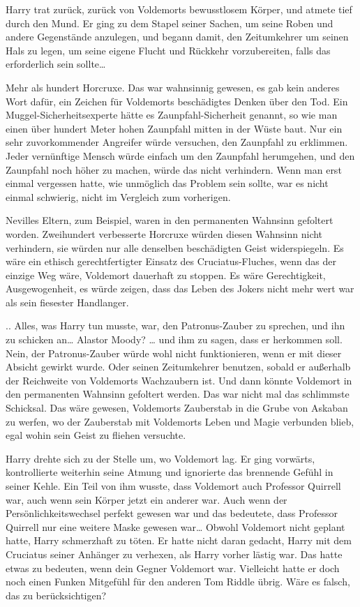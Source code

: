 {Harry trat zurück, zurück von Voldemorts bewusstlosem Körper, und atmete tief durch den Mund. Er ging zu dem Stapel seiner Sachen, um seine Roben und andere Gegenstände anzulegen, und begann damit, den Zeitumkehrer um seinen Hals zu legen, um seine eigene Flucht und Rückkehr vorzubereiten, falls das erforderlich sein sollte…

Mehr als hundert Horcruxe. Das war wahnsinnig gewesen, es gab kein anderes Wort dafür, ein Zeichen für Voldemorts beschädigtes Denken über den Tod. Ein Muggel-Sicherheitsexperte hätte es Zaunpfahl-Sicherheit genannt, so wie man einen über hundert Meter hohen Zaunpfahl mitten in der Wüste baut. Nur ein sehr zuvorkommender Angreifer würde versuchen, den Zaunpfahl zu erklimmen. Jeder vernünftige Mensch würde einfach um den Zaunpfahl herumgehen, und den Zaunpfahl noch höher zu machen, würde das nicht verhindern. Wenn man erst einmal vergessen hatte, wie unmöglich das Problem sein sollte, war es nicht einmal schwierig, nicht im Vergleich zum vorherigen.

Nevilles Eltern, zum Beispiel, waren in den permanenten Wahnsinn gefoltert worden. Zweihundert verbesserte Horcruxe würden diesen Wahnsinn nicht verhindern, sie würden nur alle denselben beschädigten Geist widerspiegeln. Es wäre ein ethisch gerechtfertigter Einsatz des Cruciatus-Fluches, wenn das der einzige Weg wäre, Voldemort dauerhaft zu stoppen. Es wäre Gerechtigkeit, Ausgewogenheit, es würde zeigen, dass das Leben des Jokers nicht mehr wert war als sein fiesester Handlanger.

.. Alles, was Harry tun musste, war, den Patronus-Zauber zu sprechen, und ihn zu schicken an… Alastor Moody? … und ihm zu sagen, dass er herkommen soll. Nein, der Patronus-Zauber würde wohl nicht funktionieren, wenn er mit dieser Absicht gewirkt wurde. Oder seinen Zeitumkehrer benutzen, sobald er außerhalb der Reichweite von Voldemorts Wachzaubern ist. Und dann könnte Voldemort in den permanenten Wahnsinn gefoltert werden. Das war nicht mal das schlimmste Schicksal. Das wäre gewesen, Voldemorts Zauberstab in die Grube von Askaban zu werfen, wo der Zauberstab mit Voldemorts Leben und Magie verbunden blieb, egal wohin sein Geist zu fliehen versuchte.

Harry drehte sich zu der Stelle um, wo Voldemort lag. Er ging vorwärts, kontrollierte weiterhin seine Atmung und ignorierte das brennende Gefühl in seiner Kehle. Ein Teil von ihm wusste, dass Voldemort auch Professor Quirrell war, auch wenn sein Körper jetzt ein anderer war. Auch wenn der Persönlichkeitswechsel perfekt gewesen war und das bedeutete, dass Professor Quirrell nur eine weitere Maske gewesen war… Obwohl Voldemort nicht geplant hatte, Harry schmerzhaft zu töten. Er hatte nicht daran gedacht, Harry mit dem Cruciatus seiner Anhänger zu verhexen, als Harry vorher lästig war. Das hatte etwas zu bedeuten, wenn dein Gegner Voldemort war. Vielleicht hatte er doch noch einen Funken Mitgefühl für den anderen Tom Riddle übrig. Wäre es falsch, das zu berücksichtigen?

}
